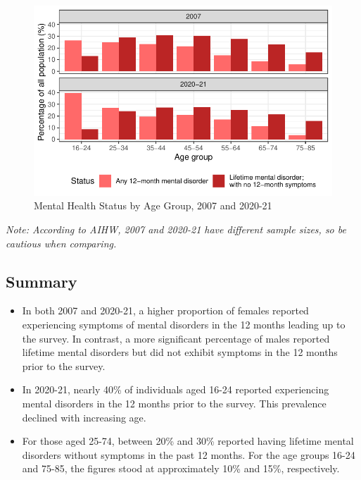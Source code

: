 \documentclass[
  a4paper,
  DIV=11,
  numbers=noendperiod]{scrreport}
\begin{document}
\begin{figure}

\caption{\label{fig-mhsag}Mental Health Status by Age Group, 2007 and
2020-21}

{\centering \includegraphics{./chap1-prevalence-of-md_files/figure-pdf/fig-mhsag-1.pdf}

}

\end{figure}

\emph{Note: According to AIHW, 2007 and 2020-21 have different sample
sizes, so be cautious when comparing.}

\hypertarget{summary}{%
\subsection{Summary}\label{summary}}

\begin{itemize}
\item
  In both 2007 and 2020-21, a higher proportion of females reported
  experiencing symptoms of mental disorders in the 12 months leading up
  to the survey. In contrast, a more significant percentage of males
  reported lifetime mental disorders but did not exhibit symptoms in the
  12 months prior to the survey.
\item
  In 2020-21, nearly 40\% of individuals aged 16-24 reported
  experiencing mental disorders in the 12 months prior to the survey.
  This prevalence declined with increasing age.
\item
  For those aged 25-74, between 20\% and 30\% reported having lifetime
  mental disorders without symptoms in the past 12 months. For the age
  groups 16-24 and 75-85, the figures stood at approximately 10\% and
  15\%, respectively.
\end{itemize}
\end{document}
